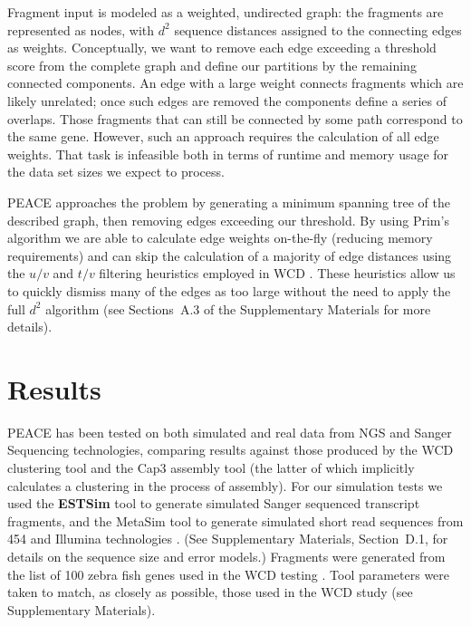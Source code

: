 \documentclass[a4,center,fleqn]{NAR}
\newcommand{\mc}[1]{#1}
\newcommand{\peace} {{\small PEACE}}
\newcommand{\wcd} {{\small WCD}}
\newcommand{\capthree} {{\small Cap3}}
\newcommand{\metasim} {{\small MetaSim}}
\begin{document}
Fragment input is modeled as a weighted, undirected graph: the
fragments are represented as nodes, with $d^2$ sequence distances
assigned to the connecting edges as weights.  Conceptually, we want to
remove each edge exceeding a threshold score from the complete graph
and define our partitions by the remaining connected components.  An
edge with a large weight connects fragments which are likely
unrelated; once such edges are removed the components define a series
of overlaps.  Those fragments that can still be connected by some path
correspond to the same gene.  However, such an approach requires the
calculation of all edge weights.  That task is infeasible both in terms
of runtime and memory usage for the data set sizes we expect to process.

\peace\/ approaches the problem by generating a minimum spanning tree of the
described graph, then removing edges exceeding our threshold.  By
using Prim's algorithm we are able to calculate edge weights
on-the-fly (reducing memory requirements) and can skip the
calculation of a majority of edge distances using the $u/v$ and $t/v$
filtering heuristics employed in \wcd\/ \cite{Hazelhurst08a}.
These heuristics allow us to quickly dismiss many of the edges as too
large without the need to apply the full $d^2$ algorithm (see
Sections~A.3 of the Supplementary Materials for more details). 


\section{Results}

\peace\/ has been tested on both simulated and real data from NGS and
Sanger Sequencing technologies, comparing results against those
produced by the \wcd\/ clustering tool \cite{Hazelhurst08a} and the
\capthree\/ assembly tool \cite{Huang99} (the latter of which
implicitly calculates a clustering in the process of assembly).
\mc{For our simulation tests we used the {\bf ESTSim} tool to generate
  simulated Sanger sequenced transcript fragments, and the \metasim\/
  tool to generate simulated short read sequences from 454 and Illumina
  technologies \cite{Hazelhurst03,Richter2008}.  (See Supplementary
  Materials, Section~D.1, for details on the sequence size and error
  models.)  Fragments were generated from the list of 100 zebra fish
  genes used in the \wcd\/ testing \cite{Hazelhurst08a}.  Tool
  parameters were taken to match, as closely as possible, those used
  in the \wcd\/ study (see Supplementary Materials).  }
\end{document}
